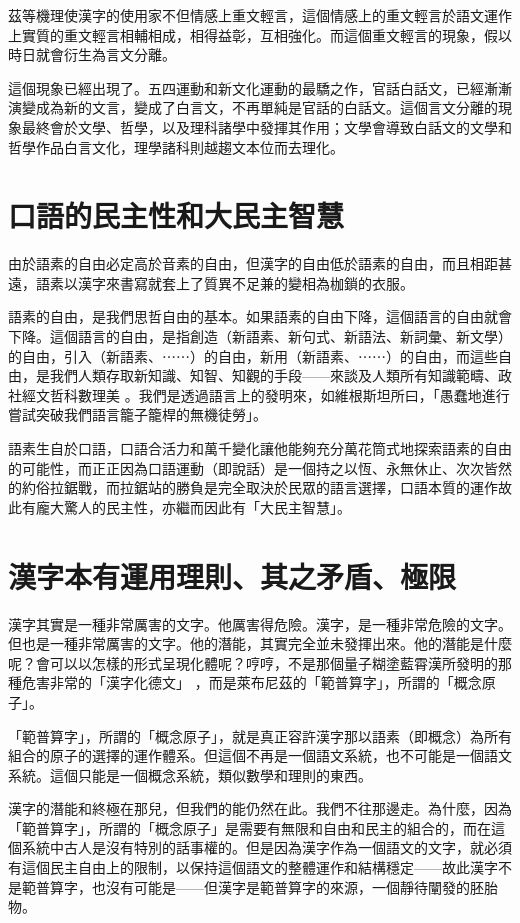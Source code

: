 \documentclass[a5paper, 10pt, openany]{book} %
\begin{document}
茲等機理使漢字的使用家不但情感上重文輕言，這個情感上的重文輕言於語文運作上實質的重文輕言相輔相成，相得益彰，互相強化。而這個重文輕言的現象，假以時日就會衍生為言文分離。

這個現象已經出現了。五四運動和新文化運動的最驕之作，官話白話文，已經漸漸演變成為新的文言，變成了白言文，不再單純是官話的白話文。這個言文分離的現象最終會於文學、哲學，以及理科諸學中發揮其作用；文學會導致白話文的文學和哲學作品白言文化，理學諸科則越趨文本位而去理化。

\section{口語的民主性和大民主智慧}

由於語素的自由必定高於音素的自由，但漢字的自由低於語素的自由，而且相距甚遠，語素以漢字來書寫就套上了質異不足兼的變相為枷鎖的衣服。

語素的自由，是我們思哲自由的基本。如果語素的自由下降，這個語言的自由就會下降。這個語言的自由，是指創造（新語素、新句式、新語法、新詞彙、新文學）的自由，引入（新語素、⋯⋯）的自由，新用（新語素、⋯⋯）的自由，而這些自由，是我們人類存取新知識、知智、知觀的手段——來談及人類所有知識範疇、政社經文哲科數理美 。我們是透過語言上的發明來，如維根斯坦所曰，「愚蠢地進行嘗試突破我們語言籠子籠桿的無機徒勞」。

語素生自於口語，口語合活力和萬千變化讓他能夠充分萬花筒式地探索語素的自由的可能性，而正正因為口語運動（即說話）是一個持之以恆、永無休止、次次皆然的約俗拉鋸戰，而拉鋸站的勝負是完全取決於民眾的語言選擇，口語本質的運作故此有龐大驚人的民主性，亦繼而因此有「大民主智慧」。

\section{漢字本有運用理則、其之矛盾、極限}

漢字其實是一種非常厲害的文字。他厲害得危險。漢字，是一種非常危險的文字。但也是一種非常厲害的文字。他的潛能，其實完全並未發揮出來。他的潛能是什麼呢？會可以以怎樣的形式呈現化體呢？哼哼，不是那個量子糊塗藍霄漢所發明的那種危害非常的「漢字化德文」 ，而是萊布尼茲的「範普算字」，所謂的「概念原子」。

「範普算字」，所謂的「概念原子」，就是真正容許漢字那以語素（即概念）為所有組合的原子的選擇的運作體系。但這個不再是一個語文系統，也不可能是一個語文系統。這個只能是一個概念系統，類似數學和理則的東西。

漢字的潛能和終極在那兒，但我們的能仍然在此。我們不往那邊走。為什麼，因為「範普算字」，所謂的「概念原子」是需要有無限和自由和民主的組合的，而在這個系統中古人是沒有特別的話事權的。但是因為漢字作為一個語文的文字，就必須有這個民主自由上的限制，以保持這個語文的整體運作和結構穩定——故此漢字不是範普算字，也沒有可能是——但漢字是範普算字的來源，一個靜待闡發的胚胎物。
\end{document}
